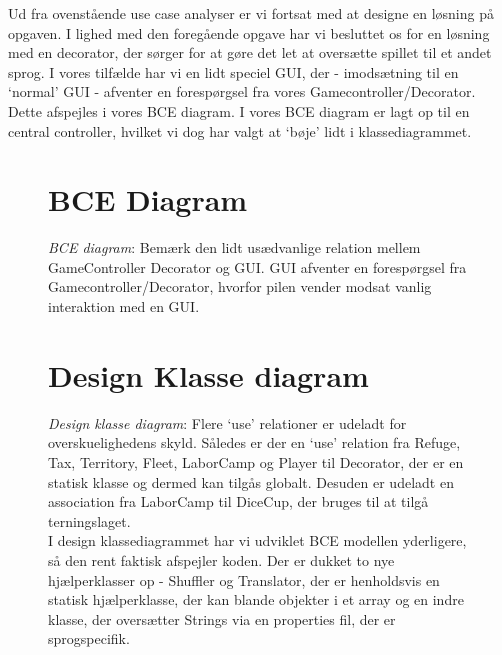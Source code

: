 Ud fra ovenstående use case analyser er vi fortsat med at designe en løsning på
opgaven. I lighed med den foregående opgave har vi besluttet os for en løsning
med en decorator, der sørger for at gøre det let at oversætte spillet til et
andet sprog. I vores tilfælde har vi en lidt speciel GUI, der - imodsætning til
en ‘normal’ GUI - afventer en forespørgsel fra vores Gamecontroller/Decorator.
Dette afspejles i vores BCE diagram. I vores BCE diagram er lagt op til en
central controller, hvilket vi dog har valgt at ‘bøje’ lidt i
klassediagrammet.\\
\FloatBarrier
\begin{figure}[h]
\section*{BCE Diagram}
\centering
{}
\caption{\emph{BCE diagram}: Bemærk den lidt usædvanlige
relation mellem GameController Decorator og GUI. GUI afventer en forespørgsel
fra Gamecontroller/Decorator, hvorfor pilen vender modsat vanlig interaktion med
en GUI.}
\end{figure}
\FloatBarrier
\begin{figure}[h]
\section*{Design Klasse diagram}
\centering
{}
\caption{\emph{Design klasse diagram}: Flere ‘use’ relationer er udeladt for
overskuelighedens skyld. Således er der en ‘use’ relation fra Refuge, Tax,
Territory, Fleet, LaborCamp og Player til Decorator, der er en statisk klasse og
dermed kan tilgås globalt. Desuden er udeladt en association fra LaborCamp til
DiceCup, der bruges til at tilgå terningslaget.\\
I design klassediagrammet har vi udviklet BCE modellen yderligere, så
den rent faktisk afspejler koden. Der er dukket to nye hjælperklasser op - Shuffler og
Translator, der er henholdsvis en statisk hjælperklasse, der kan blande objekter
i et array og en indre klasse, der oversætter Strings via en properties fil,
der er sprogspecifik.}
\end{figure}
\FloatBarrier
